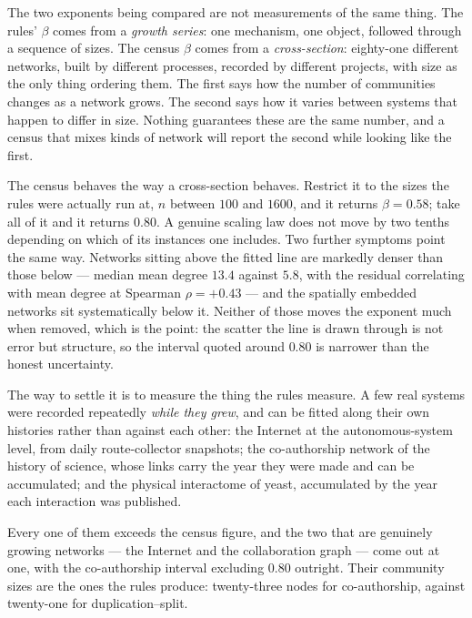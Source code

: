 The two exponents being compared are not measurements of the same thing. The
rules' $\beta$ comes from a \emph{growth series}: one mechanism, one object,
followed through a sequence of sizes. The census $\beta$ comes from a
\emph{cross-section}: eighty-one different networks, built by different processes,
recorded by different projects, with size as the only thing ordering them. The
first says how the number of communities changes as a network grows. The second
says how it varies between systems that happen to differ in size. Nothing
guarantees these are the same number, and a census that mixes kinds of network
will report the second while looking like the first.

The census behaves the way a cross-section behaves. Restrict it to the sizes the
rules were actually run at, $n$ between $100$ and $1600$, and it returns
$\beta=0.58$; take all of it and it returns $0.80$. A genuine scaling law does not
move by two tenths depending on which of its instances one includes. Two further
symptoms point the same way. Networks sitting above the fitted line are markedly
denser than those below --- median mean degree $13.4$ against $5.8$, with the
residual correlating with mean degree at Spearman $\rho=+0.43$ --- and the
spatially embedded networks sit systematically below it. Neither of those moves
the exponent much when removed, which is the point: the scatter the line is drawn
through is not error but structure, so the interval quoted around $0.80$ is
narrower than the honest uncertainty.

The way to settle it is to measure the thing the rules measure. A few real systems
were recorded repeatedly \emph{while they grew}, and can be fitted along their own
histories rather than against each other: the Internet at the autonomous-system
level, from daily route-collector snapshots; the co-authorship network of the
history of science, whose links carry the year they were made and can be
accumulated; and the physical interactome of yeast, accumulated by the year each
interaction was published.



\noindent Every one of them exceeds the census figure, and the two that are
genuinely growing networks --- the Internet and the collaboration graph --- come
out at one, with the co-authorship interval excluding $0.80$ outright. Their
community sizes are the ones the rules produce: twenty-three nodes for
co-authorship, against twenty-one for duplication--split.

